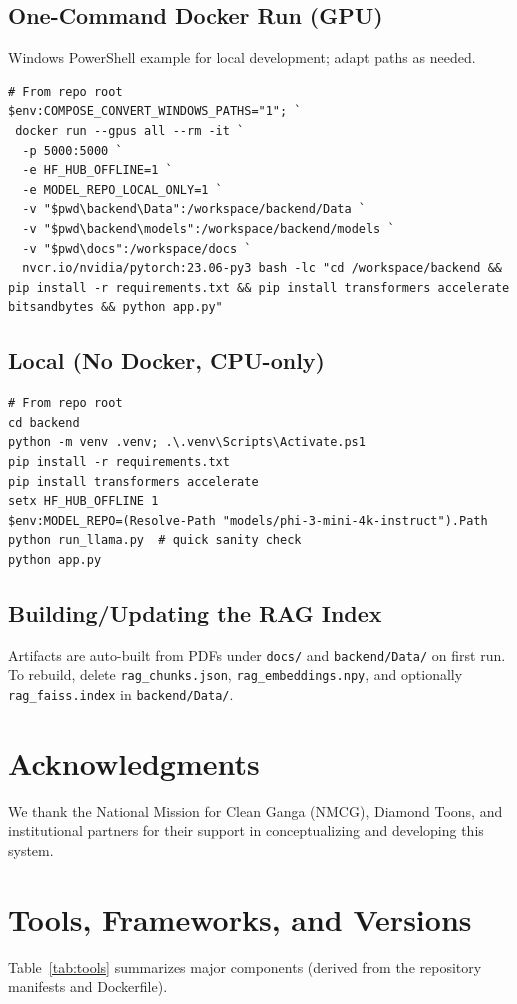 \documentclass[conference]{IEEEtran}
\begin{document}
\subsection{One-Command Docker Run (GPU)}
Windows PowerShell example for local development; adapt paths as needed.
\begin{lstlisting}[basicstyle=\ttfamily\small]
# From repo root
$env:COMPOSE_CONVERT_WINDOWS_PATHS="1"; `
 docker run --gpus all --rm -it `
  -p 5000:5000 `
  -e HF_HUB_OFFLINE=1 `
  -e MODEL_REPO_LOCAL_ONLY=1 `
  -v "$pwd\backend\Data":/workspace/backend/Data `
  -v "$pwd\backend\models":/workspace/backend/models `
  -v "$pwd\docs":/workspace/docs `
  nvcr.io/nvidia/pytorch:23.06-py3 bash -lc "cd /workspace/backend && pip install -r requirements.txt && pip install transformers accelerate bitsandbytes && python app.py"
\end{lstlisting}

\subsection{Local (No Docker, CPU-only)}
\begin{lstlisting}[basicstyle=\ttfamily\small]
# From repo root
cd backend
python -m venv .venv; .\.venv\Scripts\Activate.ps1
pip install -r requirements.txt
pip install transformers accelerate
setx HF_HUB_OFFLINE 1
$env:MODEL_REPO=(Resolve-Path "models/phi-3-mini-4k-instruct").Path
python run_llama.py  # quick sanity check
python app.py
\end{lstlisting}

\subsection{Building/Updating the RAG Index}
Artifacts are auto-built from PDFs under \texttt{docs/} and \texttt{backend/Data/} on first run. To rebuild, delete \texttt{rag\_chunks.json}, \texttt{rag\_embeddings.npy}, and optionally \texttt{rag\_faiss.index} in \texttt{backend/Data/}.

\section*{Acknowledgments}
We thank the National Mission for Clean Ganga (NMCG), Diamond Toons, and institutional partners for their support in conceptualizing and developing this system.

\section*{Tools, Frameworks, and Versions}
Table~\ref{tab:tools} summarizes major components (derived from the repository manifests and Dockerfile).
\end{document}
